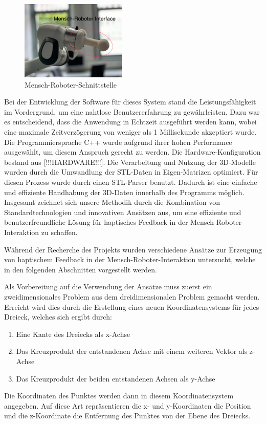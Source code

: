 \documentclass[conference]{IEEEtran}
\begin{document}
\begin{figure}
    \centering
    \includegraphics[width=0.45\textwidth]{pics/interface.jpeg}
    \caption{Mensch-Roboter-Schnittstelle}
    \label{fig:MRinterface}
\end{figure}

Bei der Entwicklung der Software für dieses System stand die Leistungsfähigkeit 
im Vordergrund, um eine nahtlose Benutzererfahrung zu gewährleisten. Dazu war es 
entscheidend, dass die Anwendung in Echtzeit ausgeführt werden kann, wobei eine maximale 
Zeitverzögerung von weniger als 1 Millisekunde akzeptiert wurde. Die Programmiersprache 
C++ wurde aufgrund ihrer hohen Performance ausgewählt, um diesem Anspruch gerecht zu werden. 
Die Hardware-Konfiguration bestand aus [!!!HARDWARE!!!].
Die Verarbeitung und Nutzung der 3D-Modelle wurden durch die Umwandlung der STL-Daten in 
Eigen-Matrizen optimiert. Für diesen Prozess wurde durch einen STL-Parser benutzt. Dadurch ist 
eine einfache und effiziente Handhabung der 3D-Daten innerhalb des Programms möglich.
Insgesamt zeichnet sich unsere Methodik durch die Kombination von Standardtechnologien 
und innovativen Ansätzen aus, um eine effiziente und benutzerfreundliche Lösung für haptisches 
Feedback in der Mensch-Roboter-Interaktion zu schaffen.

Während der Recherche des Projekts wurden verschiedene Ansätze zur Erzeugung von haptischem Feedback 
in der Mensch-Roboter-Interaktion untersucht, welche in den folgenden Abschnitten vorgestellt werden.

Als Vorbereitung  auf die Verwendung der Ansätze muss zuerst ein zweidimensionales Problem aus dem 
dreidimensionalen Problem gemacht werden. Erreicht wird dies durch die Erstellung eines neuen 
Koordinatensystems für jedes Dreieck, welches sich ergibt durch:
\begin{enumerate}
    \item Eine Kante des Dreiecks als x-Achse
    \item Das Kreuzprodukt der entstandenen Achse mit einem weiteren Vektor als z-Achse
    \item Das Kreuzprodukt der beiden entstandenen Achsen als y-Achse
\end{enumerate}
Die Koordinaten des Punktes werden dann in diesem Koordinatensystem angegeben. Auf diese Art 
repräsentieren die x- und y-Koordinaten die Position und die z-Koordinate die Entfernung des Punktes 
von der Ebene des Dreiecks. 
\end{document}
